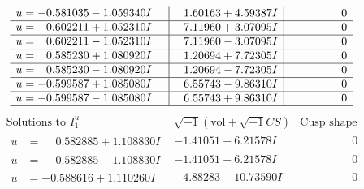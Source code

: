 \documentclass[1p]{elsarticle_modified}
\theoremstyle{definition}
\newcommand{\I}{\sqrt{-1}}
\begin{document}
$$\begin{array}{c|c|c}
\begin{aligned}
u &= -0.581035 - 1.059340 I\end{aligned}
 & \phantom{-}1.60163 + 4.59387 I & \phantom{-0.000000 } 0 \\ \hline\begin{aligned}
u &= \phantom{-}0.602211 + 1.052310 I\end{aligned}
 & \phantom{-}7.11960 + 3.07095 I & \phantom{-0.000000 } 0 \\ \hline\begin{aligned}
u &= \phantom{-}0.602211 - 1.052310 I\end{aligned}
 & \phantom{-}7.11960 - 3.07095 I & \phantom{-0.000000 } 0 \\ \hline\begin{aligned}
u &= \phantom{-}0.585230 + 1.080920 I\end{aligned}
 & \phantom{-}1.20694 + 7.72305 I & \phantom{-0.000000 } 0 \\ \hline\begin{aligned}
u &= \phantom{-}0.585230 - 1.080920 I\end{aligned}
 & \phantom{-}1.20694 - 7.72305 I & \phantom{-0.000000 } 0 \\ \hline\begin{aligned}
u &= -0.599587 + 1.085080 I\end{aligned}
 & \phantom{-}6.55743 - 9.86310 I & \phantom{-0.000000 } 0 \\ \hline\begin{aligned}
u &= -0.599587 - 1.085080 I\end{aligned}
 & \phantom{-}6.55743 + 9.86310 I & \phantom{-0.000000 } 0\\
 \hline 
 \end{array}$$\newpage$$\begin{array}{c|c|c}  
\text{Solutions to }I^u_{1}& \I (\text{vol} + \sqrt{-1}CS) & \text{Cusp shape}\\
 \hline 
\begin{aligned}
u &= \phantom{-}0.582885 + 1.108830 I\end{aligned}
 & -1.41051 + 6.21578 I & \phantom{-0.000000 } 0 \\ \hline\begin{aligned}
u &= \phantom{-}0.582885 - 1.108830 I\end{aligned}
 & -1.41051 - 6.21578 I & \phantom{-0.000000 } 0 \\ \hline\begin{aligned}
u &= -0.588616 + 1.110260 I\end{aligned}
 & -4.88283 - 10.73590 I & \phantom{-0.000000 } 0 \\ \hline\begin{aligned}

\end{aligned}
\end{array}$$
\end{document}
